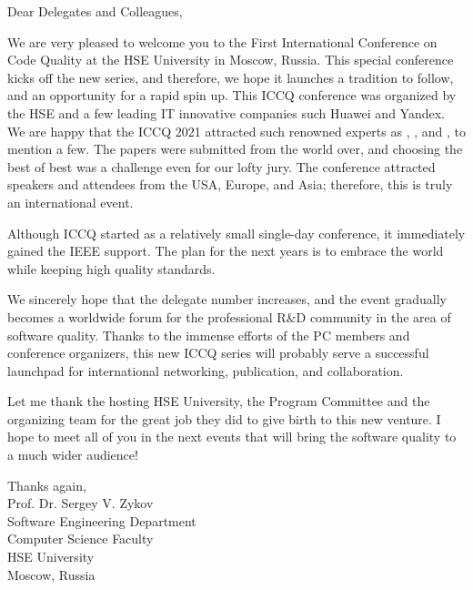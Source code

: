 
\clearpage
{}

Dear Delegates and Colleagues,

We are very pleased to welcome you to the First International Conference on Code Quality at the HSE University in Moscow, Russia. This special conference kicks off the new series, and therefore, we hope it launches a tradition to follow, and an opportunity for a rapid spin up. This ICCQ conference was organized by the HSE and a few leading IT innovative companies such Huawei and Yandex. We are happy that the ICCQ 2021 attracted such renowned experts as , , and , to mention a few. The papers were submitted from the world over, and choosing the best of best was a challenge even for our lofty jury. The conference attracted speakers and attendees from the USA, Europe, and Asia; therefore, this is truly an international event.

Although ICCQ started as a relatively small single-day conference, it immediately gained the IEEE support. The plan for the next years is to embrace the world while keeping high quality standards.

We sincerely hope that the delegate number increases, and the event gradually becomes a worldwide forum for the professional R\&D community in the area of software quality. Thanks to the immense efforts of the PC members and conference organizers, this new ICCQ series will probably serve a successful launchpad for international networking, publication, and collaboration.

Let me thank the hosting HSE University, the Program Committee and the organizing team for the great job they did to give birth to this new venture. I hope to meet all of you in the next events that will bring the software quality to a much wider audience!

Thanks again,\\
Prof. Dr. Sergey V. Zykov\\
Software Engineering Department\\
Computer Science Faculty\\
HSE University\\
Moscow, Russia
